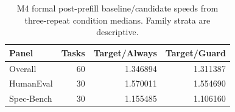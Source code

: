 \begin{table}[t]\centering\small
\caption{M4 formal post-prefill baseline/candidate speeds from three-repeat condition medians. Family strata are descriptive.}\label{tab:m4_strata}
\begin{tabular}{@{}lrrr@{}}\toprule
Panel & Tasks & Target/Always & Target/Guard\\\midrule
Overall & 60 & 1.346894 & 1.311387\\
HumanEval & 30 & 1.570011 & 1.554690\\
Spec-Bench & 30 & 1.155485 & 1.106160\\
\bottomrule\end{tabular}

\end{table}
